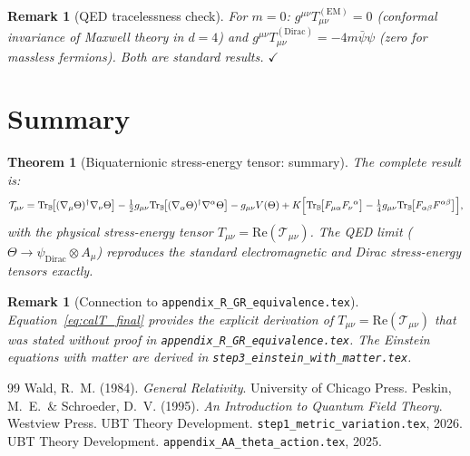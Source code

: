 \documentclass[12pt]{article}
\newtheorem{theorem}[definition]{Theorem}
\newtheorem{remark}[definition]{Remark}
\newcommand{\Tr}{\mathrm{Tr}}
\newcommand{\re}{\mathrm{Re}}
\begin{document}
\begin{remark}[QED tracelessness check]
  For $m=0$: $g^{\mu\nu}T^{(\mathrm{EM})}_{\mu\nu} = 0$ (conformal invariance
  of Maxwell theory in $d=4$) and $g^{\mu\nu}T^{(\mathrm{Dirac})}_{\mu\nu}
  = -4m\bar{\psi}\psi$ (zero for massless fermions).
  Both are standard results. $\checkmark$
\end{remark}

\section{Summary}

\begin{theorem}[Biquaternionic stress-energy tensor: summary]
The complete result is:
\begin{equation}
  \label{eq:calT_final}
  \mathcal{T}_{\mu\nu}
  = \Tr_{\mathbb{B}}\!\bigl[(\nabla_\mu\Theta)^\dagger\nabla_\nu\Theta\bigr]
    -\tfrac{1}{2}g_{\mu\nu}\Tr_{\mathbb{B}}\!\bigl[(\nabla_\alpha\Theta)^\dagger
    \nabla^\alpha\Theta\bigr]
    - g_{\mu\nu}V(\Theta)
    + K\Bigl[\Tr_{\mathbb{B}}\!\bigl[F_{\mu\alpha}F_\nu{}^\alpha\bigr]
      -\tfrac{1}{4}g_{\mu\nu}\Tr_{\mathbb{B}}\!\bigl[F_{\alpha\beta}F^{\alpha\beta}
    \bigr]\Bigr],
\end{equation}
with the physical stress-energy tensor $T_{\mu\nu} = \re(\mathcal{T}_{\mu\nu})$.
The QED limit ($\Theta \to \psi_{\mathrm{Dirac}}\otimes A_\mu$) reproduces the
standard electromagnetic and Dirac stress-energy tensors exactly.
\end{theorem}

\begin{remark}[Connection to \texttt{appendix\_R\_GR\_equivalence.tex}]
  Equation~\eqref{eq:calT_final} provides the explicit derivation of
  $T_{\mu\nu} = \re(\mathcal{T}_{\mu\nu})$ that was stated without proof
  in \texttt{appendix\_R\_GR\_equivalence.tex}.
  The Einstein equations with matter are derived in
  \texttt{step3\_einstein\_with\_matter.tex}.
\end{remark}

\begin{thebibliography}{99}
    Wald, R.~M. (1984). \textit{General Relativity}.
                  University of Chicago Press.
      Peskin, M.~E.\ \& Schroeder, D.~V. (1995).
                  \textit{An Introduction to Quantum Field Theory}.
                  Westview Press.
   UBT Theory Development.
                  \texttt{step1\_metric\_variation.tex}, 2026.
                  UBT Theory Development.
                  \texttt{appendix\_AA\_theta\_action.tex}, 2025.
\end{thebibliography}
\end{document}

